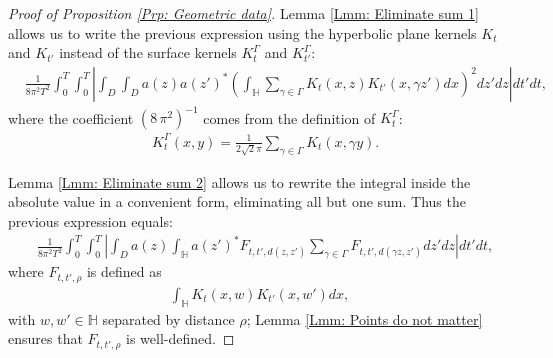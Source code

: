 \documentclass[10pt,a4paper]{amsart}
\begin{document}
\begin{proof}[Proof of Proposition \ref{Prp: Geometric data}]
Lemma \ref{Lmm: Eliminate sum 1} allows us to write the previous expression using the hyperbolic plane kernels $ K_{t} $ and $ K_{t'} $ instead of the surface kernels $ K_{t}^{\Gamma} $ and $ K_{t'}^{\Gamma} $: 
\begin{align*}
	&
	\frac{1}{8 \pi^{2} T^{2}} \int_{0}^{T} \int_{0}^{T} \left| \int_{D} \int_{D} a( z ) a( z' )^{*} \left( \int_{\mathbb{H}} \sum_{\gamma \in \Gamma}^{} K_{t}( x,z ) K_{t'}( x, \gamma z' ) dx \right)^{2} dz' dz \right| dt' dt,
\end{align*}
where the coefficient $ ( 8 \, \pi^{2} )^{-1} $ comes from the definition of $ K_{t}^{\Gamma} $:
\begin{align*}
	&
	K_{t}^{\Gamma}( x,y ) = \frac{1}{2 \sqrt{2 }\pi} \sum_{\gamma \in \Gamma}^{} K_{t}( x, \gamma y ).
\end{align*}


Lemma \ref{Lmm: Eliminate sum 2} allows us to rewrite the integral inside the absolute value in a convenient form, eliminating all but one sum. Thus the previous expression equals:
\begin{align}
	&
	\label{Expr: Introducing F}
	\frac{1}{ 8 \pi^{2} T^{2}} \int_{0}^{T} \int_{0}^{T} \left| \int_{D} a( z ) \int_{\mathbb{H}} a( z' )^{*}   F_{t,t', d( z,z' )}  \sum_{\gamma \in \Gamma}^{} F_{t,t', d( \gamma z, z' )} dz' dz \right| dt' dt,
\end{align}
where $ F_{t,t', \rho} $ is defined as
\begin{align*}
\int_{\mathbb{H}} K_{t}( x,w ) K_{t'}( x,w' ) dx,
\end{align*}
with $ w, w' \in \mathbb{H} $ separated by distance $ \rho $; Lemma \ref{Lmm: Points do not matter} ensures that $ F_{t,t',\rho} $ is well-defined. 


\end{proof}
\end{document}
